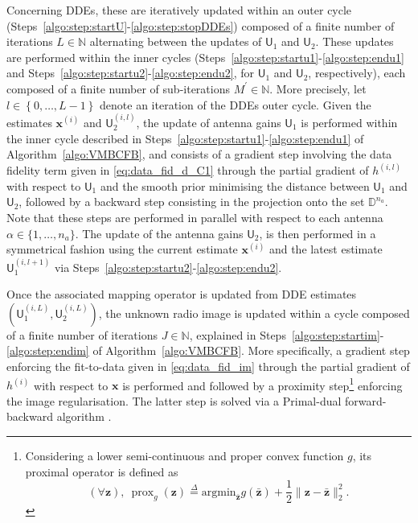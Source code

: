 \documentclass[fleqn,usenatbib]{mnras}
\newcommand{\xb}{\ensuremath{\boldsymbol{x}}}
\newcommand{\zb}{\ensuremath{\boldsymbol{z}}}
\newcommand{\Ub}{\ensuremath{\boldsymbol{\mathsf{U}}}}
\newcommand{\eD}{\mathbb{D}}
\newcommand{\eN}{\mathbb{N}}
\newcommand{\prox}{\ensuremath{\operatorname{prox}}}
\begin{document}
Concerning DDEs, these are iteratively updated within an outer cycle {(Steps~\ref{algo:step:startU}-\ref{algo:step:stopDDEs})} composed of a finite number of iterations $L\in \eN$ alternating between the updates of $\Ub_1$ and $\Ub_2$. {These updates are performed within the inner cycles (Steps~\ref{algo:step:startu1}-\ref{algo:step:endu1} and Steps~\ref{algo:step:startu2}-\ref{algo:step:endu2}, for $\Ub_1$ and $\Ub_2$, respectively), each} composed of a finite number of sub-iterations $M^{\prime}\in \eN$. More precisely, let $l\in \left \lbrace 0,\dots,L-1 \right \rbrace$ denote an iteration of the DDEs outer cycle. Given the estimates $\xb^{(i)}$ and $\Ub_2^{(i,l)}$, the update of antenna gains $\Ub_{1}$ is performed within the inner cycle described in Steps~\ref{algo:step:startu1}-\ref{algo:step:endu1} of Algorithm~\ref{algo:VMBCFB}, and consists of a gradient step involving the data fidelity term given in \eqref{eq:data_fid_d_C1} through the partial gradient of ${h}^{(i,l)}$ with respect to $\Ub_{1}$ and the smooth prior minimising the distance between $\Ub_{1}$ and $\Ub_{2}$, followed by a backward step consisting in the projection onto the set $\eD^{n_a}$. Note that these steps are performed in parallel with respect to each antenna $\alpha \in \{1,\dots,n_a\}$. The update of the antenna gains $\Ub_2$, is then performed in a symmetrical fashion using the current estimate $\xb^{(i)}$ and the latest estimate $\Ub_1^{(i,l+1)}$ via Steps~\ref{algo:step:startu2}-\ref{algo:step:endu2}. 

Once the associated mapping operator is updated from DDE estimates $\left(\Ub_1^{(i,L)},\Ub_2^{(i,L)}\right)$, the unknown radio image is updated within a cycle composed of a finite number of iterations $J\in \eN$, explained in Steps~\ref{algo:step:startim}-\ref{algo:step:endim} of Algorithm~\ref{algo:VMBCFB}. More specifically, a gradient step enforcing the fit-to-data given in \eqref{eq:data_fid_im} through the partial gradient of $h^{(i)}$ with respect to $\xb$ is performed and followed by a proximity step\footnote{Considering a lower semi-continuous and proper convex function $g$, its proximal operator is defined as 
\begin{equation}
	 (\forall\zb), ~\prox_g (\zb) \overset{\Delta}{=} \textrm{argmin}_{\bar{\zb}} g(\bar{\zb}) + \frac{1}{2} \| \zb - \bar{\zb}\|_2^2.\end{equation}}
enforcing the image regularisation. The latter step is solved via a Primal-dual forward-backward algorithm \citep{Condat2013,Vu2013}. 
 
\end{document}
